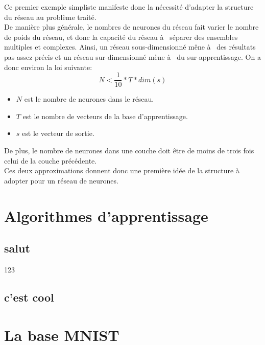\documentclass[a4paper,twoside]{report}
\begin{document}
                Ce premier exemple simpliste manifeste donc la nécessité d'adapter la structure du réseau au problème traité.\\

                De manière plus générale, le nombres de neurones du réseau fait varier le nombre de poids du réseau, et donc la capacité du réseau à  séparer des ensembles multiples et complexes. Ainsi, un réseau sous-dimensionné mêne à  des résultats pas assez précis et un réseau sur-dimensionné mène à  du sur-apprentissage. On a donc environ la loi suivante:
                \begin{equation}
                    N<\frac{1}{10}*T*dim(s)
                \end{equation}
                \begin{itemize}
                    \item $N$ est le nombre de neurones dans le réseau.
                    \item $T$ est le nombre de vecteurs de la base d'apprentissage.
                    \item $s$ est le vecteur de sortie.
                \end{itemize}

                De plus, le nombre de neurones dans une couche doit être de moins de trois fois celui de la couche précédente.\\

                Ces deux approximations donnent donc une première idée de la structure à  adopter pour un réseau de neurones.



        \chapter{Algorithmes d'apprentissage}

            \section{salut}

                123


            \section{c'est cool}


        \chapter{La base MNIST}
\end{document}
